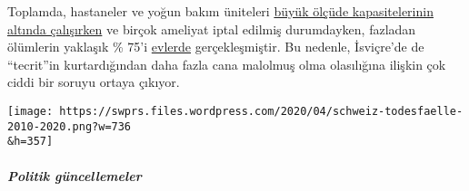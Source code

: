 Toplamda, hastaneler ve yoğun bakım üniteleri
\href{https://swprs.files.wordpress.com/2020/04/intensivbettenbelegung-schweiz-2020-04-14.png}{büyük
ölçüde kapasitelerinin altında çalışırken} ve birçok ameliyat iptal
edilmiş durumdayken, fazladan ölümlerin yaklaşık \% 75'i
\href{https://www.tagesspiegel.de/wissen/woran-sterben-corona-patienten-wirklich-ein-schweizer-forscher-macht-hoffnung-im-kampf-gegen-covid-19/25750666.html}{evlerde}
gerçekleşmiştir. Bu nedenle, İsviçre'de de ``tecrit''in kurtardığından
daha fazla cana malolmuş olma olasılığına ilişkin çok ciddi bir soruyu
ortaya çıkıyor.

\texttt{[image: https://swprs.files.wordpress.com/2020/04/schweiz-todesfaelle-2010-2020.png?w=736\\\&h=357]}

\hypertarget{politik-guxfcncellemeler}{%
\subparagraph{\texorpdfstring{\textbf{Politik
güncellemeler}}{Politik güncellemeler}}\label{politik-guxfcncellemeler}}

